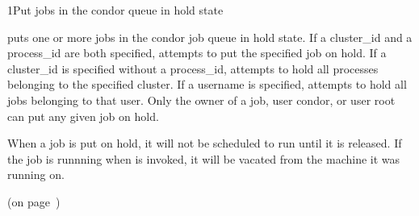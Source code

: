 \begin{ManPage}{}{1}{Put jobs in the condor queue in hold state}
\label{man-condor-hold}
\Synopsis {}


\Description

 puts one or more jobs in the condor job queue in hold state.  If a
cluster\_id and a process\_id are both specified,  attempts to
put the specified job on hold. If a cluster\_id is specified
without a process\_id,  attempts to hold all processes belonging
to the specified cluster. If a username is specified,  attempts to
hold all jobs belonging to that user. Only the owner of a job, user condor,
or user root can put any given job on hold.

When a job is put on hold, it will not be scheduled to run until it is released.
If the job is runnning when  is invoked, it will be vacated from the
machine it was running on.

\begin{Options}
\end{Options}

\SeeAlso
{} (on page~\pageref{man-condor-release})

\end{ManPage}
